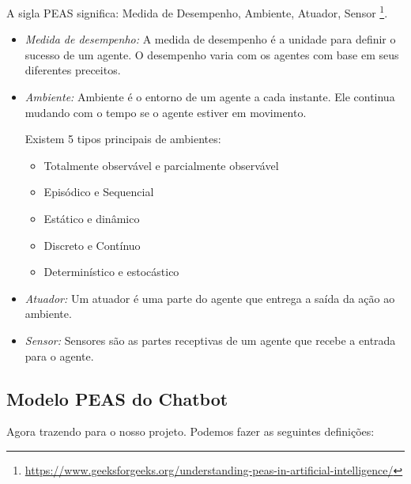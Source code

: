 A sigla PEAS significa: Medida de Desempenho, Ambiente, Atuador, Sensor \footnote{\url{https://www.geeksforgeeks.org/understanding-peas-in-artificial-intelligence/}}.
\begin{itemize}

   \item \textit{Medida de desempenho:} A medida de desempenho é a unidade para definir o sucesso de um agente. O desempenho varia com os agentes com base em seus diferentes preceitos.


   \item \textit{Ambiente:} Ambiente é o entorno de um agente a cada instante. Ele continua mudando com o tempo se o agente estiver em movimento.

         Existem 5 tipos principais de ambientes:
         \begin{itemize}
            \item Totalmente observável e parcialmente observável
            \item Episódico e Sequencial
            \item Estático e dinâmico
            \item Discreto e Contínuo
            \item Determinístico e estocástico

         \end{itemize}



   \item \textit{Atuador:} Um atuador é uma parte do agente que entrega a saída da ação ao ambiente.
   \item \textit{Sensor:} Sensores são as partes receptivas de um agente que recebe a entrada para o agente.
\end{itemize}

\subsection[Modelo PEAS do Chatbot]{Modelo PEAS do Chatbot}

Agora trazendo para o nosso projeto. Podemos fazer as seguintes definições:

